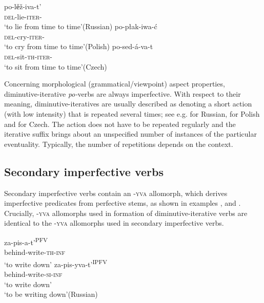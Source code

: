 \documentclass[output=paper,colorlinks,citecolor=brown]{langscibook}
\begin{document}
\ea\label{biskup:ex:pref-rus}\gll po-lёž-iva-t'\\
\textsc{del}-lie-\textsc{iter}-\INF\\
\glt ‘to lie from time to time’\hfill (Russian)
\z
\ea\label{biskup:ex:pref-po}\gll po-płak-iwa-ć\\
\textsc{del}-cry-\textsc{iter}-\INF\\
\glt ‘to cry from time to time’\hfill (Polish)
\z
\ea\label{biskup:ex:pref-cz}\gll po-sed-á-va-t\\
\textsc{del}-sit-\textsc{th}-\textsc{iter}-\INF\\
\glt ‘to sit from time to time’\hfill (Czech)
\z

\noindent Concerning morphological (grammatical/viewpoint) aspect properties, di\-min\-u\-tive-iterative \textit{po-}verbs are always imperfective. With respect to their meaning, di\-min\-ut\-ive-iteratives are usually described as denoting a short action (with low intensity) that is repeated several times; see e.g. \citet[103]{Zaliznjak.Smelev1997} for Russian, \citet[23]{Czochralski1975} for Polish and \citet[194, 209]{Karlik.etal1995} for Czech. The action does not have to be repeated regularly and the iterative suffix brings about an unspecified number of instances of the particular eventuality. Typically, the number of repetitions depends on the context.

\subsection{Secondary imperfective verbs} \label{biskup:sec:intro-sec}

Secondary imperfective verbs contain an \textsc{-yva} allomorph, which derives imperfective predicates from perfective stems, as shown in examples ,  and . Crucially, \textsc{-yva} allomorphs used in formation of diminutive-iterative verbs are identical to the \textsc{-yva} allomorphs used in secondary imperfective verbs.


\ea\label{biskup:ex:second-rus}\ea\gll za-pis-a-t'\textsuperscript{PFV}\\
behind-write-\textsc{th-inf}\\
\glt `to write down'\label{biskup:ex:second-rus.a}
\ex\gll za-pis-yva-t'\textsuperscript{IPFV}\\
behind-write-\textsc{si-inf}\\
\glt `to write down'\\`to be writing down'\hfill (Russian)\label{biskup:ex:second-rus.b}
\z\z
\end{document}
